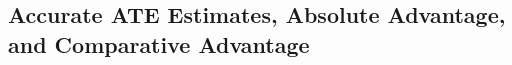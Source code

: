 \documentclass[12pt]{article}
\theoremstyle{definition}
\theoremstyle{definition}
\theoremstyle{definition}
\theoremstyle{definition}
\newtheorem{thm}{Theorem}
\begin{document}
    
    

    
   \subsection{Accurate ATE Estimates, Absolute Advantage, and Comparative Advantage }
\end{document}
